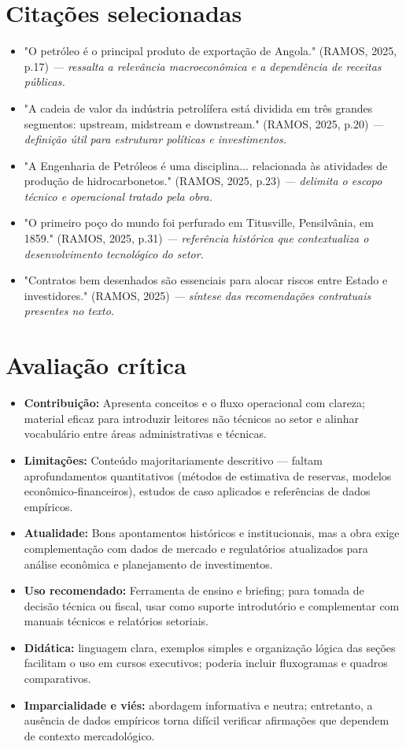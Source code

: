 \documentclass[12pt,a4paper]{article}
\begin{document}
\section*{Citações selecionadas}
\begin{itemize}
  \item "O petróleo é o principal produto de exportação de Angola." (RAMOS, 2025, p.17) \emph{— ressalta a relevância macroeconômica e a dependência de receitas públicas.}
  \item "A cadeia de valor da indústria petrolífera está dividida em três grandes segmentos: upstream, midstream e downstream." (RAMOS, 2025, p.20) \emph{— definição útil para estruturar políticas e investimentos.}
  \item "A Engenharia de Petróleos é uma disciplina... relacionada às atividades de produção de hidrocarbonetos." (RAMOS, 2025, p.23) \emph{— delimita o escopo técnico e operacional tratado pela obra.}
  \item "O primeiro poço do mundo foi perfurado em Titusville, Pensilvânia, em 1859." (RAMOS, 2025, p.31) \emph{— referência histórica que contextualiza o desenvolvimento tecnológico do setor.}
  \item "Contratos bem desenhados são essenciais para alocar riscos entre Estado e investidores." (RAMOS, 2025) \emph{— síntese das recomendações contratuais presentes no texto.}
\end{itemize}

\section*{Avaliação crítica}
\begin{itemize}
  \item \textbf{Contribuição:} Apresenta conceitos e o fluxo operacional com clareza; material eficaz para introduzir leitores não técnicos ao setor e alinhar vocabulário entre áreas administrativas e técnicas.
  \item \textbf{Limitações:} Conteúdo majoritariamente descritivo — faltam aprofundamentos quantitativos (métodos de estimativa de reservas, modelos econômico‑financeiros), estudos de caso aplicados e referências de dados empíricos.
  \item \textbf{Atualidade:} Bons apontamentos históricos e institucionais, mas a obra exige complementação com dados de mercado e regulatórios atualizados para análise econômica e planejamento de investimentos.
  \item \textbf{Uso recomendado:} Ferramenta de ensino e briefing; para tomada de decisão técnica ou fiscal, usar como suporte introdutório e complementar com manuais técnicos e relatórios setoriais.
  \item \textbf{Didática:} linguagem clara, exemplos simples e organização lógica das seções facilitam o uso em cursos executivos; poderia incluir fluxogramas e quadros comparativos.
  \item \textbf{Imparcialidade e viés:} abordagem informativa e neutra; entretanto, a ausência de dados empíricos torna difícil verificar afirmações que dependem de contexto mercadológico.
\end{itemize}
\end{document}
